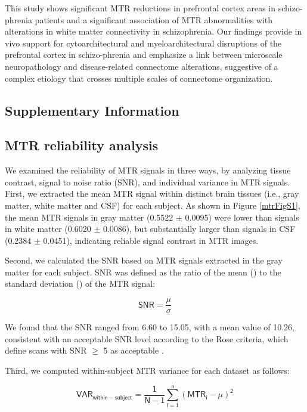 \begin{refsection}
This study shows significant MTR reductions in prefrontal cortex areas in schizo-phrenia patients and a significant association of MTR abnormalities with alterations in white matter connectivity in schizophrenia. Our findings provide in vivo support for cytoarchitectural and myeloarchitectural disruptions of the prefrontal cortex in schizo-phrenia and emphasize a link between microscale neuropathology and disease-related connectome alterations, suggestive of a complex etiology that crosses multiple scales of connectome organization.

\printbibliography[heading=subbibliography]

\end{refsection}

\newpage
\begin{refsection}
\section*{Supplementary Information}
\subsection*{MTR reliability analysis}
We examined the reliability of MTR signals in three ways, by analyzing tissue contrast, signal to noise ratio (SNR), and individual variance in MTR signals. First, we extracted the mean MTR signal within distinct brain tissues (i.e., gray matter, white matter and CSF) for each subject. As shown in Figure \ref{mtrFigS1}, the mean MTR signals in gray matter (0.5522 $\pm$ 0.0095) were lower than signals in white matter (0.6020 $\pm$ 0.0086), but substantially larger than signals in CSF (0.2384 $\pm$ 0.0451), indicating reliable signal contrast in MTR images.

Second, we calculated the SNR based on MTR signals extracted in the gray matter for each subject. SNR was defined as the ratio of the mean (\textmu) to the standard deviation (\textsigma) of the MTR signal:

\[\mathsf{ SNR = \frac{\mu}{\sigma}} \] 

We found that the SNR ranged from 6.60 to 15.05, with a mean value of 10.26, consistent with an acceptable SNR level according to the Rose criteria, which define scans with SNR $\mathsf{\geq}$ 5 as acceptable \citep{Bushberg2011TheEP}.

Third, we computed within-subject MTR variance for each dataset as follows:

\[ \mathsf{VAR_{within-subject} = \frac{1}{N-1}\sum_{i=1}^{n}(MTR_{i}-\mu)^{2}} \]


\end{refsection}

